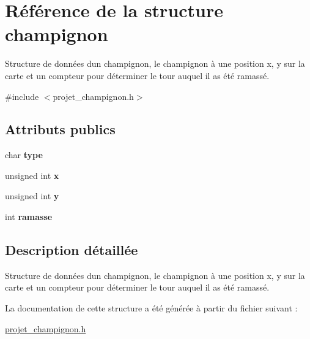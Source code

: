 \hypertarget{structchampignon}{}\section{Référence de la structure champignon}
\label{structchampignon}


Structure de données d\textquotesingle{}un champignon, le champignon à une position x, y sur la carte et un compteur pour déterminer le tour auquel il as été ramassé.  




{\ttfamily \#include $<$projet\+\_\+champignon.\+h$>$}

\subsection*{Attributs publics}
\begin{DoxyCompactItemize}
\item 
\hypertarget{structchampignon_aed63571ad4e8a8fb84e27398c7654189}{}\label{structchampignon_aed63571ad4e8a8fb84e27398c7654189} 
char {\bfseries type}
\item 
\hypertarget{structchampignon_ae6d65e3ec067e0541f53e0fdba0b461e}{}\label{structchampignon_ae6d65e3ec067e0541f53e0fdba0b461e} 
unsigned int {\bfseries x}
\item 
\hypertarget{structchampignon_a20c6668a2e7d9deb6490fe648e1be7de}{}\label{structchampignon_a20c6668a2e7d9deb6490fe648e1be7de} 
unsigned int {\bfseries y}
\item 
\hypertarget{structchampignon_aa3293013f3ad679d31612b2c34c049b4}{}\label{structchampignon_aa3293013f3ad679d31612b2c34c049b4} 
int {\bfseries ramasse}
\end{DoxyCompactItemize}


\subsection{Description détaillée}
Structure de données d\textquotesingle{}un champignon, le champignon à une position x, y sur la carte et un compteur pour déterminer le tour auquel il as été ramassé. 

La documentation de cette structure a été générée à partir du fichier suivant \+:\begin{DoxyCompactItemize}
\item 
\hyperlink{projet__champignon_8h}{projet\+\_\+champignon.\+h}\end{DoxyCompactItemize}
